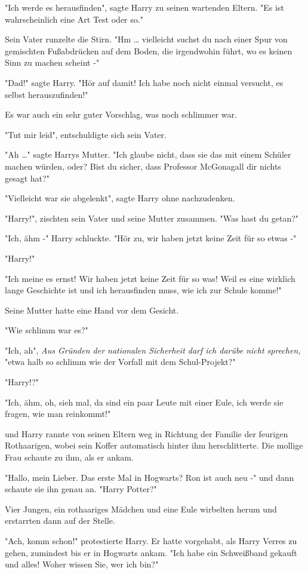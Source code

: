 {"Ich werde es herausfinden", sagte Harry zu seinen wartenden Eltern. "Es ist wahrscheinlich eine Art Test oder so."

Sein Vater runzelte die Stirn. "Hm … vielleicht suchst du nach einer Spur von gemischten Fußabdrücken auf dem Boden, die irgendwohin führt, wo es keinen Sinn zu machen scheint -"

"Dad!" sagte Harry. "Hör auf damit! Ich habe noch nicht einmal versucht, es selbst herauszufinden!"

Es war auch ein sehr guter Vorschlag, was noch schlimmer war.

"Tut mir leid", entschuldigte sich sein Vater.

"Ah …" sagte Harrys Mutter. "Ich glaube nicht, dass sie das mit einem Schüler machen würden, oder? Bist du sicher, dass Professor McGonagall dir nichts gesagt hat?"

"Vielleicht war sie abgelenkt", sagte Harry ohne nachzudenken.

"Harry!", zischten sein Vater und seine Mutter zusammen. "Was hast du getan?"

"Ich, ähm -" Harry schluckte. "Hör zu, wir haben jetzt keine Zeit für so etwas -"

"Harry!"

"Ich meine es ernst! Wir haben jetzt keine Zeit für so was! Weil es eine wirklich lange Geschichte ist und ich herausfinden muss, wie ich zur Schule komme!"

Seine Mutter hatte eine Hand vor dem Gesicht.

"Wie schlimm war es?"

"Ich, ah", \emph{Aus Gründen der nationalen Sicherheit darf ich darübe nicht sprechen,} "etwa halb so schlimm wie der Vorfall mit dem Schul-Projekt?"

"Harry!?"

"Ich, ähm, oh, sieh mal, da sind ein paar Leute mit einer Eule, ich werde sie fragen, wie man reinkommt!"

und Harry rannte von seinen Eltern weg in Richtung der Familie der feurigen Rothaarigen, wobei sein Koffer automatisch hinter ihm herschlitterte. Die mollige Frau schaute zu ihm, als er ankam.

"Hallo, mein Lieber. Das erste Mal in Hogwarts? Ron ist auch neu -" und dann schaute sie ihn genau an. "Harry Potter?"

Vier Jungen, ein rothaariges Mädchen und eine Eule wirbelten herum und erstarrten dann auf der Stelle.

"Ach, komm schon!" protestierte Harry. Er hatte vorgehabt, als Harry Verres zu gehen, zumindest bis er in Hogwarts ankam. "Ich habe ein Schweißband gekauft und alles! Woher wissen Sie, wer ich bin?"

}
